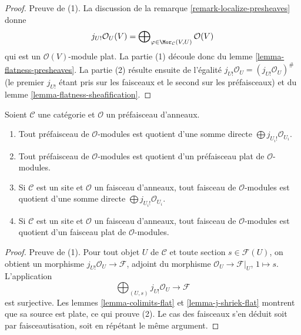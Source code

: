 \begin{proof}
Preuve de (1). La discussion de la remarque
\ref{remark-localize-presheaves} donne
$$
j_{U!}\mathcal{O}_U(V)
=
\bigoplus\nolimits_{\varphi \in \Mor_\mathcal{C}(V, U)}
\mathcal{O}(V)
$$
qui est un $\mathcal{O}(V)$-module plat. La partie (1) découle donc du lemme
\ref{lemma-flatness-presheaves}. La partie (2) résulte ensuite de l'égalité
$j_{U!}\mathcal{O}_U = (j_{U!}\mathcal{O}_U)^\#$ (le premier $j_{U!}$
étant pris sur les faisceaux et le second sur les préfaisceaux) et du lemme
\ref{lemma-flatness-sheafification}.
\end{proof}

\begin{lemma}

\label{lemma-module-quotient-flat}

Soient $\mathcal{C}$ une catégorie et $\mathcal{O}$ un préfaisceau d'anneaux.

\begin{enumerate}

\item Tout préfaisceau de $\mathcal{O}$-modules est quotient d'une somme
directe $\bigoplus j_{U_i!}\mathcal{O}_{U_i}$.
\item Tout préfaisceau de $\mathcal{O}$-modules est quotient d'un préfaisceau
plat de $\mathcal{O}$-modules.
\item Si $\mathcal{C}$ est un site et $\mathcal{O}$ un faisceau d'anneaux,
tout faisceau de $\mathcal{O}$-modules est quotient d'une somme directe
$\bigoplus j_{U_i!}\mathcal{O}_{U_i}$.
\item Si $\mathcal{C}$ est un site et $\mathcal{O}$ un faisceau d'anneaux,
tout faisceau de $\mathcal{O}$-modules est quotient d'un faisceau plat de
$\mathcal{O}$-modules.

\end{enumerate}

\end{lemma}

\begin{proof}
Preuve de (1). Pour tout objet $U$ de $\mathcal{C}$ et toute section
$s \in \mathcal{F}(U)$, on obtient un morphisme
$j_{U!}\mathcal{O}_U \to \mathcal{F}$, adjoint du morphisme
$\mathcal{O}_U \to \mathcal{F}|_U$, $1 \mapsto s$. L'application
$$
\bigoplus\nolimits_{(U, s)} j_{U!}\mathcal{O}_U
\longrightarrow
\mathcal{F}
$$
est surjective. Les lemmes \ref{lemma-colimits-flat} et
\ref{lemma-j-shriek-flat} montrent que sa source est plate, ce qui prouve
(2). Le cas des faisceaux s'en déduit soit par faisceautisation, soit en
répétant le même argument.
\end{proof}

